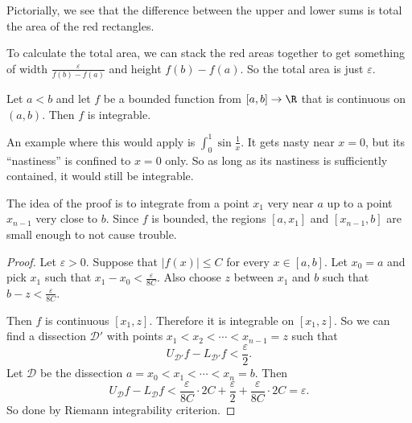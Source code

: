 \documentclass[a4paper]{article}
\begin{document}
Pictorially, we see that the difference between the upper and lower sums is total the area of the red rectangles.
\begin{center}
\end{center}
To calculate the total area, we can stack the red areas together to get something of width $\frac{\varepsilon}{f(b) - f(a)}$ and height $f(b) - f(a)$. So the total area is just $\varepsilon$.

\begin{lemma}
  Let $a < b$ and let $f$ be a bounded function from $[a, b] \to \R$ that is continuous on $(a, b)$. Then $f$ is integrable.
\end{lemma}
An example where this would apply is $\int_0^1 \sin \frac{1}{x}$. It gets nasty near $x = 0$, but its ``nastiness'' is confined to $x = 0$ only. So as long as its nastiness is sufficiently contained, it would still be integrable.

The idea of the proof is to integrate from a point $x_1$ very near $a$ up to a point $x_{n - 1}$ very close to $b$. Since $f$ is bounded, the regions $[a, x_1]$ and $[x_{n - 1}, b]$ are small enough to not cause trouble.

\begin{proof}
  Let $\varepsilon > 0$. Suppose that $|f(x)| \leq C$ for every $x\in [a, b]$. Let $x_0 = a$ and pick $x_1$ such that $x_1 - x_0 < \frac{\varepsilon}{8C}$. Also choose $z$ between $x_1$ and $b$ such that $b - z < \frac{\varepsilon}{8C}$.

  Then $f$ is continuous $[x_1, z]$. Therefore it is integrable on $[x_1, z]$. So we can find a dissection $\mathcal{D}'$ with points $x_1 < x_2 < \cdots < x_{n - 1} = z$ such that
  \[
    U_{\mathcal{D}'}f - L_{\mathcal{D}'}f < \frac{\varepsilon}{2}.
  \]
  Let $\mathcal{D}$ be the dissection $a = x_0 < x_1 < \cdots < x_n = b$. Then
  \[
    U_\mathcal{D} f - L_\mathcal{D} f < \frac{\varepsilon}{8C}\cdot 2C + \frac{\varepsilon}{2} + \frac{\varepsilon}{8C}\cdot 2C = \varepsilon.
  \]
  So done by Riemann integrability criterion.
\end{proof}
\end{document}
